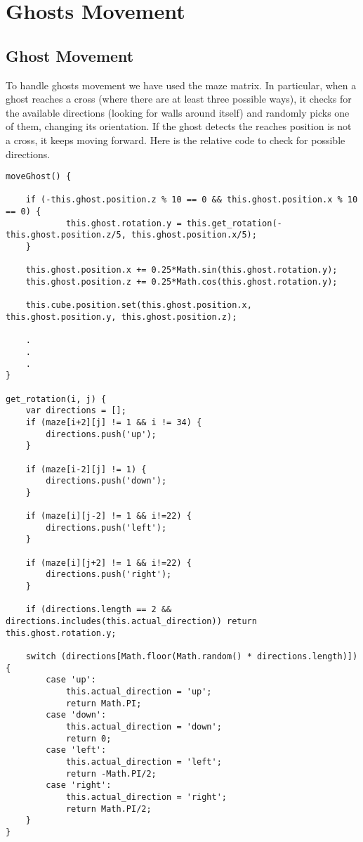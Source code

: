 \documentclass[a4paper,oneside]{report}
\begin{document}
\section{Ghosts Movement}
\subsection{Ghost Movement}
To handle ghosts movement we have used the maze matrix. In particular, when a ghost reaches a cross (where there are at least three possible ways), it checks for the available directions (looking for walls around itself) and randomly picks one of them, changing its orientation. If the ghost detects the reaches position is not a cross, it keeps moving forward. Here is the relative code to check for possible directions.
\begin{lstlisting}
moveGhost() {

    if (-this.ghost.position.z % 10 == 0 && this.ghost.position.x % 10 == 0) {
            this.ghost.rotation.y = this.get_rotation(-this.ghost.position.z/5, this.ghost.position.x/5);
    }

    this.ghost.position.x += 0.25*Math.sin(this.ghost.rotation.y);
    this.ghost.position.z += 0.25*Math.cos(this.ghost.rotation.y);

    this.cube.position.set(this.ghost.position.x, this.ghost.position.y, this.ghost.position.z);
        
    .
    .
    .
}

get_rotation(i, j) {
    var directions = [];
    if (maze[i+2][j] != 1 && i != 34) {
        directions.push('up');
    }

    if (maze[i-2][j] != 1) {
        directions.push('down');
    }

    if (maze[i][j-2] != 1 && i!=22) {
        directions.push('left');
    }
    
    if (maze[i][j+2] != 1 && i!=22) {
        directions.push('right');
    }

    if (directions.length == 2 && directions.includes(this.actual_direction)) return this.ghost.rotation.y;
        
    switch (directions[Math.floor(Math.random() * directions.length)]) {
        case 'up':
            this.actual_direction = 'up';
            return Math.PI;
        case 'down':
            this.actual_direction = 'down';
            return 0;
        case 'left': 
            this.actual_direction = 'left';
            return -Math.PI/2;
        case 'right':
            this.actual_direction = 'right';
            return Math.PI/2;
    }
}


\end{lstlisting}
\end{document}
